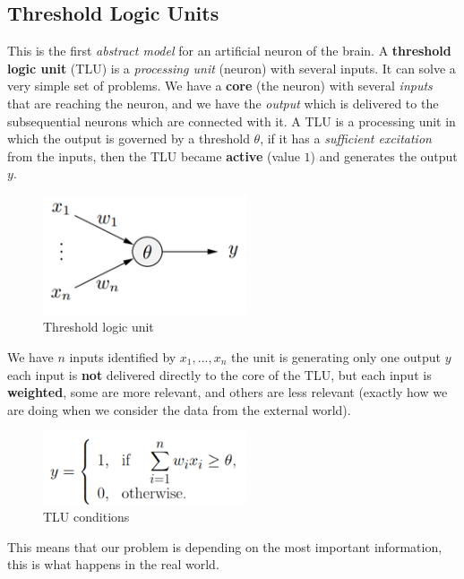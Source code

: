 \documentclass{article}
\begin{document}
\subsection{Threshold Logic Units}
This is the first \textit{abstract model} for an artificial neuron of the brain.
A \textbf{threshold logic unit} (TLU) is a \textit{processing unit} (neuron) with several inputs.
It can solve a very simple set of problems.
\newline\newline
We have a \textbf{core} (the neuron) with several \textit{inputs} that are reaching the neuron, and we have the
\textit{output} which is delivered to the subsequential neurons which are connected with it.
A TLU is a processing unit in which the output is governed by a threshold $\theta$, if it has a \textit{sufficient excitation}
from the inputs, then the TLU became \textbf{active} (value $1$) and generates the output $y$.
\begin{figure}[H]
    \centering
    \includegraphics[width=6cm]{images/tlu.png}
    \caption{Threshold logic unit}
    \label{fig:tlu}
\end{figure}
We have $n$ inputs identified by $x_1,...,x_n$ the unit is generating only one output $y$ each input is \textbf{not}
delivered directly to the core of the TLU, but each input is \textbf{weighted}, some are more relevant,
and others are less relevant (exactly how we are doing when we consider the data from the external world).
\begin{figure}[H]
    \centering
    \includegraphics[width=6cm]{images/tlu_working_system.png}
    \caption{TLU conditions}
    \label{fig:tlu_conditions}
\end{figure}
This means that our problem is depending on the most important information, this is what happens in the real world.
\newline\newline
\end{document}
